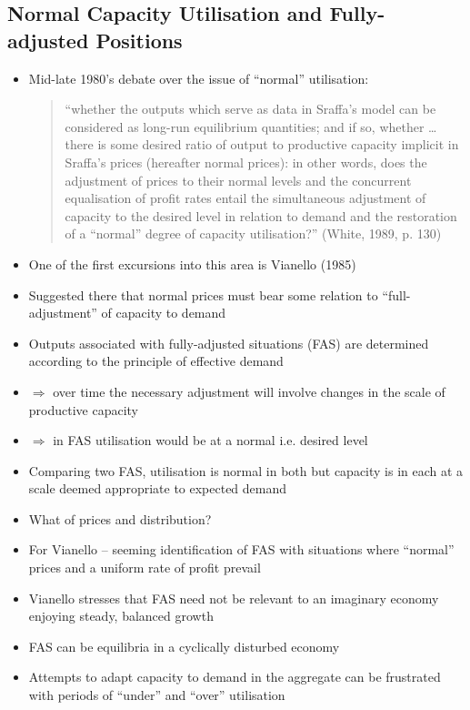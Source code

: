 \documentclass{article}
\begin{document}
\subsection{Normal Capacity Utilisation and Fully-adjusted Positions}
	\begin{itemize}
		\item Mid-late 1980's debate over the issue of ``normal'' utilisation:
		\begin{quote}
			``whether the outputs which serve as data in Sraffa's model can be considered as long-run equilibrium quantities; and if so, whether \dots\: there is some desired ratio of output to productive capacity implicit in Sraffa's prices (hereafter normal prices): in other words, does the adjustment of prices to their normal levels and the concurrent equalisation of profit rates entail the simultaneous adjustment of capacity to the desired level in relation to demand and the restoration of a ``normal'' degree of capacity utilisation?'' (White, 1989, p. 130)
		\end{quote}
		\item One of the first excursions into this area is Vianello (1985)
		\item Suggested there that normal prices must bear some relation to ``full-adjustment'' of capacity to demand
		\item Outputs associated with fully-adjusted situations (FAS) are determined according to the principle of effective demand
		\item \( \Rightarrow \) over time the necessary adjustment will involve changes in the scale of productive capacity
		\item \( \Rightarrow \)	in FAS utilisation would be at a normal i.e. desired level
		\item Comparing two FAS, utilisation is normal in both but capacity is in each at a scale deemed appropriate to expected demand
		\item What of prices and distribution?
		\item For Vianello -- seeming identification of FAS with situations where ``normal'' prices and a uniform rate of profit prevail
		\item Vianello stresses that FAS need not be relevant to an imaginary economy enjoying steady, balanced growth
		\item FAS can be equilibria in a cyclically disturbed economy
		\item Attempts to adapt capacity to demand in the aggregate can be frustrated with periods of ``under'' and ``over'' utilisation

\end{itemize}
\end{document}
